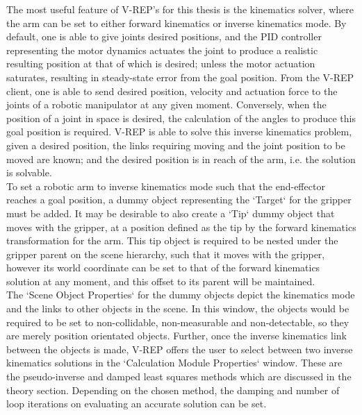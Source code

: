 \documentclass[12pt,openany,a4paper]{book}
\begin{document}
The most useful feature of V-REP's for this thesis is the kinematics solver, where the arm can be set to either forward kinematics or inverse kinematics mode. By default, one is able to give joints desired positions, and the PID controller representing the motor dynamics actuates the joint to produce a realistic resulting position at that of which is desired; unless the motor actuation saturates, resulting in steady-state error from the goal position. From the V-REP client, one is able to send desired position, velocity and actuation force to the joints of a robotic manipulator at any given moment. Conversely, when the position of a joint in space is desired, the calculation of the angles to produce this goal position is required. V-REP is able to solve this inverse kinematics problem, given a desired position, the links requiring moving and the joint position to be moved are known; and the desired position is in reach of the arm, i.e. the solution is solvable.\\
To set a robotic arm to inverse kinematics mode such that the end-effector reaches a goal position, a dummy object representing the `Target` for the gripper must be added. It may be desirable to also create a `Tip` dummy object that moves with the gripper, at a position defined as the tip by the forward kinematics transformation for the arm. This tip object is required to be nested under the gripper parent on the scene hierarchy, such that it moves with the gripper, however its world coordinate can be set to that of the forward kinematics solution at any moment, and this offset to its parent will be maintained.\\
The `Scene Object Properties` for the dummy objects depict the kinematics mode and the links to other objects in the scene. In this window, the objects would be required to be set to non-collidable, non-measurable and non-detectable, so they are merely position orientated objects. Further, once the inverse kinematics link between the objects is made, V-REP offers the user to select between two inverse kinematics solutions in the `Calculation Module Properties` window. These are the pseudo-inverse and damped least squares methods which are discussed in the theory section. Depending on the chosen method, the damping and number of loop iterations on evaluating an accurate solution can be set.\\
\end{document}
